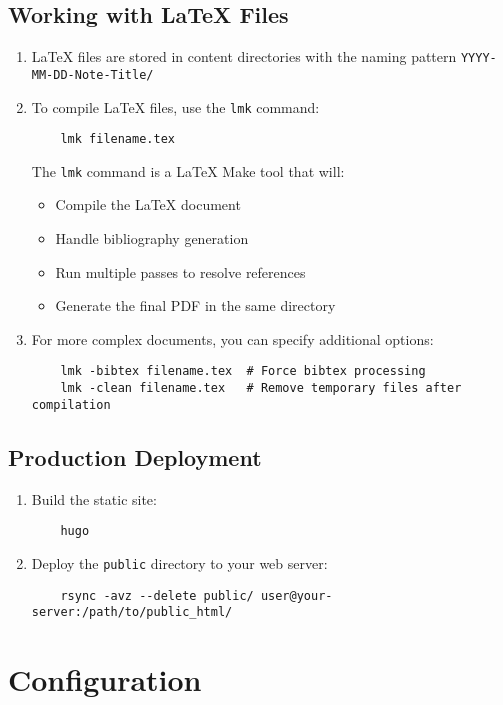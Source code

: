 \documentclass{article}
\begin{document}
\subsection{Working with LaTeX Files}
\begin{enumerate}
  \item LaTeX files are stored in content directories with the naming pattern \texttt{YYYY-MM-DD-Note-Title/}

  \item To compile LaTeX files, use the \texttt{lmk} command:
  \begin{verbatim}
    lmk filename.tex
  \end{verbatim}
  The \texttt{lmk} command is a LaTeX Make tool that will:
  \begin{itemize}
    \item Compile the LaTeX document
    \item Handle bibliography generation
    \item Run multiple passes to resolve references
    \item Generate the final PDF in the same directory
  \end{itemize}

  \item For more complex documents, you can specify additional options:
  \begin{verbatim}
    lmk -bibtex filename.tex  # Force bibtex processing
    lmk -clean filename.tex   # Remove temporary files after compilation
  \end{verbatim}
\end{enumerate}

\subsection{Production Deployment}
\begin{enumerate}
  \item Build the static site:
  \begin{verbatim}
    hugo
  \end{verbatim}

  \item Deploy the \texttt{public} directory to your web server:
  \begin{verbatim}
    rsync -avz --delete public/ user@your-server:/path/to/public_html/
  \end{verbatim}
\end{enumerate}

\section{Configuration}
\end{document}
